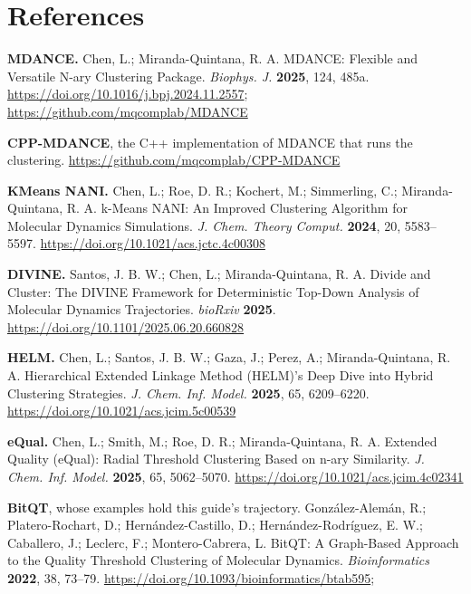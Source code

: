 \documentclass[11pt,letterpaper]{article}
\begin{document}
\section*{References}
\label{sec:references}

{\small
\begin{enumerate}[label={[\arabic*]},leftmargin=*,itemsep=0.3ex]
\item \textbf{MDANCE.} Chen, L.; Miranda-Quintana, R. A. MDANCE: Flexible and
  Versatile N-ary Clustering Package. \emph{Biophys. J.} \textbf{2025}, 124,
  485a. \url{https://doi.org/10.1016/j.bpj.2024.11.2557};
  \url{https://github.com/mqcomplab/MDANCE}
\item \textbf{CPP-MDANCE}, the C++ implementation of MDANCE that runs the
  clustering. \url{https://github.com/mqcomplab/CPP-MDANCE}
\item \textbf{KMeans NANI.} Chen, L.; Roe, D. R.; Kochert, M.; Simmerling, C.;
  Miranda-Quintana, R. A. k-Means NANI: An Improved Clustering Algorithm for
  Molecular Dynamics Simulations. \emph{J. Chem. Theory Comput.}
  \textbf{2024}, 20, 5583--5597. \url{https://doi.org/10.1021/acs.jctc.4c00308}
\item \textbf{DIVINE.} Santos, J. B. W.; Chen, L.; Miranda-Quintana, R. A.
  Divide and Cluster: The DIVINE Framework for Deterministic Top-Down Analysis
  of Molecular Dynamics Trajectories. \emph{bioRxiv} \textbf{2025}.
  \url{https://doi.org/10.1101/2025.06.20.660828}
\item \textbf{HELM.} Chen, L.; Santos, J. B. W.; Gaza, J.; Perez, A.;
  Miranda-Quintana, R. A. Hierarchical Extended Linkage Method (HELM)'s Deep
  Dive into Hybrid Clustering Strategies. \emph{J. Chem. Inf. Model.}
  \textbf{2025}, 65, 6209--6220. \url{https://doi.org/10.1021/acs.jcim.5c00539}
\item \textbf{eQual.} Chen, L.; Smith, M.; Roe, D. R.; Miranda-Quintana, R. A.
  Extended Quality (eQual): Radial Threshold Clustering Based on n-ary
  Similarity. \emph{J. Chem. Inf. Model.} \textbf{2025}, 65, 5062--5070.
  \url{https://doi.org/10.1021/acs.jcim.4c02341}
\item \textbf{BitQT}, whose examples hold this guide's trajectory.
  Gonz\'alez-Alem\'an, R.; Platero-Rochart, D.; Hern\'andez-Castillo, D.;
  Hern\'andez-Rodr\'iguez, E. W.; Caballero, J.; Leclerc, F.;
  Montero-Cabrera, L. BitQT: A Graph-Based Approach to the Quality Threshold
  Clustering of Molecular Dynamics. \emph{Bioinformatics} \textbf{2022}, 38,
  73--79. \url{https://doi.org/10.1093/bioinformatics/btab595};

\end{enumerate}}
\end{document}

